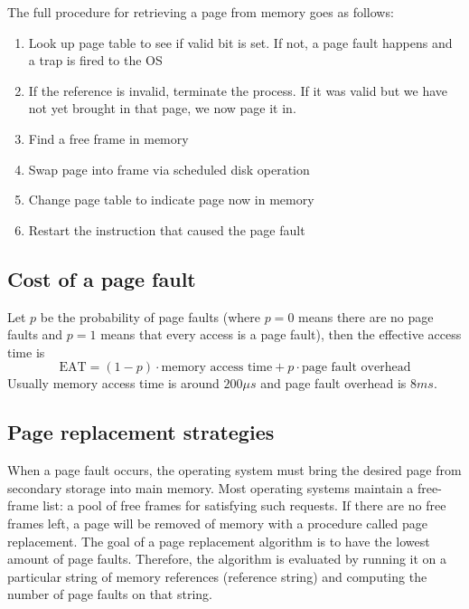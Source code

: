 
The full procedure for retrieving a page from memory goes as follows:
\begin{enumerate}
    \item Look up page table to see if valid bit is set. If not, a page fault happens and a trap is fired to the OS
    \item If the reference is invalid, terminate the process. If it was valid but we have not yet brought in that page, we now page it in.
    \item Find a free frame in memory
    \item Swap page into frame via scheduled disk operation
    \item Change page table to indicate page now in memory
    \item Restart the instruction that caused the page fault
\end{enumerate}


\subsection{Cost of a page fault}

Let $p$ be the probability of page faults (where $p=0$ means there are no page faults and $p=1$ means that every access is a page fault), then the effective access time is
$$ \text{EAT}=(1-p)\cdot\text{memory access time} + p\cdot\text{page fault overhead} $$
Usually memory access time is around $200\mu s$ and page fault overhead is $8 ms$.

\subsection{Page replacement strategies}

When a page fault occurs, the operating system must bring the desired page from secondary storage into main memory. Most operating systems maintain a free-frame list: a pool of free frames for satisfying such requests. If there are no free frames left, a page will be removed of memory with a procedure called page replacement. The goal of a page replacement algorithm is to have the lowest amount of page faults. Therefore, the algorithm is evaluated by running it on a particular string of memory
references (reference string) and computing the number of page faults
on that string.

